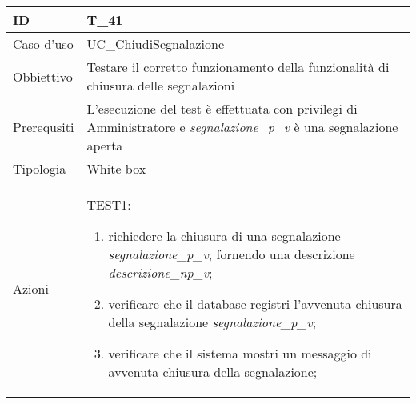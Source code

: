 \begin{table}[hb]
    \centering
    \begin{tabular}{ |p{2cm}|p{10cm}|  }
        \hline
        ID          & T\_41                                                                              \\\hline
        Caso d'uso  & UC\_ChiudiSegnalazione                                                           \\\hline
        Obbiettivo  & Testare il corretto funzionamento della funzionalità di chiusura delle segnalazioni \\\hline
        Prerequsiti & L'esecuzione del test è effettuata con privilegi di Amministratore e \emph{segnalazione\_p\_v} è una segnalazione aperta                         \\\hline
        Tipologia   & White box                                                                          \\\hline
        Azioni      &
        TEST1:
        \begin{enumerate}[nosep, topsep=0pt]
            \item richiedere la chiusura di una segnalazione \emph{segnalazione\_p\_v}, fornendo una descrizione \emph{descrizione\_np\_v};
            \item verificare che il database registri l'avvenuta chiusura della segnalazione \emph{segnalazione\_p\_v};
            \item verificare che il sistema mostri un messaggio di avvenuta chiusura della segnalazione;
        \end{enumerate}
        \\\hline
    \end{tabular}
\end{table}

